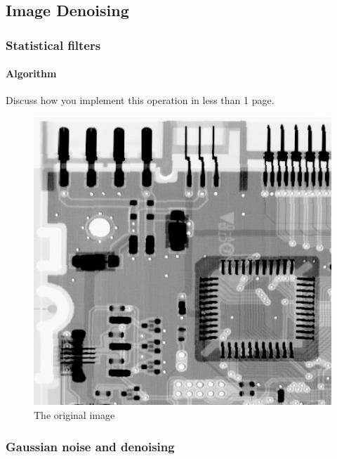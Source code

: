\documentclass{article}
\begin{document}


\subsection{Image Denoising}

\subsubsection{Statistical filters}

\paragraph{Algorithm}
Discuss how you implement this operation in less than 1 page.

\begin{figure}[]
	\centering
	\includegraphics[width=336pt]{../img/task_2.png}
	\caption{The original image}
\end{figure}

\subsubsection{Gaussian noise and denoising}
\end{document}
